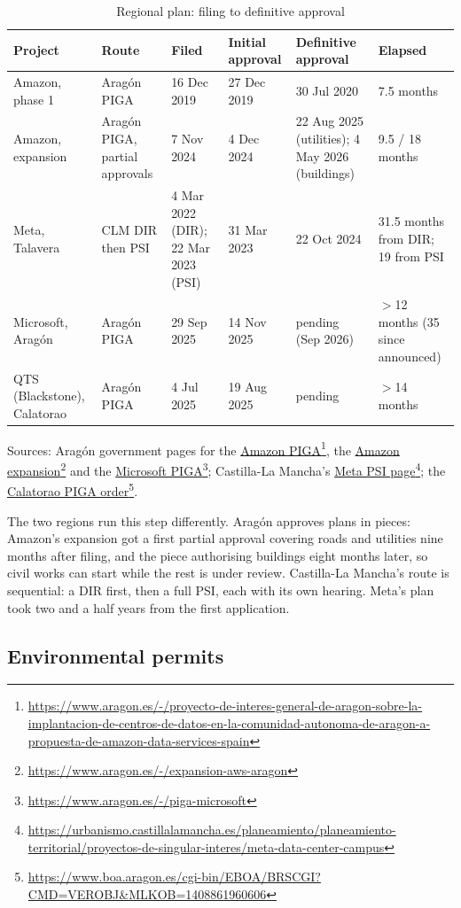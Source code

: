 \documentclass[11pt]{article}
\newcommand{\src}[2]{\href{#1}{#2}\footnote{\url{#1}}}
\begin{document}
\begin{table}[H]
\centering\small
\caption{Regional plan: filing to definitive approval}
\label{tab:plans}
\begin{tabular}{p{2.3cm}p{2.2cm}p{2.3cm}p{2.0cm}p{2.9cm}p{2.2cm}}
\toprule
Project & Route & Filed & Initial approval & Definitive approval & Elapsed \\
\midrule
Amazon, phase 1 & Aragón PIGA & 16 Dec 2019 & 27 Dec 2019 & 30 Jul 2020 & 7.5 months \\
Amazon, expansion & Aragón PIGA, partial approvals & 7 Nov 2024 & 4 Dec 2024 & 22 Aug 2025 (utilities); 4 May 2026 (buildings) & 9.5 / 18 months \\
Meta, Talavera & CLM DIR then PSI & 4 Mar 2022 (DIR); 22 Mar 2023 (PSI) & 31 Mar 2023 & 22 Oct 2024 & 31.5 months from DIR; 19 from PSI \\
Microsoft, Aragón & Aragón PIGA & 29 Sep 2025 & 14 Nov 2025 & pending (Sep 2026) & $>$12 months (35 since announced) \\
QTS (Blackstone), Calatorao & Aragón PIGA & 4 Jul 2025 & 19 Aug 2025 & pending & $>$14 months \\
\bottomrule
\end{tabular}
\end{table}

Sources: Aragón government pages for the \src{https://www.aragon.es/-/proyecto-de-interes-general-de-aragon-sobre-la-implantacion-de-centros-de-datos-en-la-comunidad-autonoma-de-aragon-a-propuesta-de-amazon-data-services-spain}{Amazon PIGA}, the \src{https://www.aragon.es/-/expansion-aws-aragon}{Amazon expansion} and the \src{https://www.aragon.es/-/piga-microsoft}{Microsoft PIGA}; Castilla-La Mancha's \src{https://urbanismo.castillalamancha.es/planeamiento/planeamiento-territorial/proyectos-de-singular-interes/meta-data-center-campus}{Meta PSI page}; the \src{https://www.boa.aragon.es/cgi-bin/EBOA/BRSCGI?CMD=VEROBJ&MLKOB=1408861960606}{Calatorao PIGA order}.

The two regions run this step differently. Aragón approves plans in pieces: Amazon's expansion got a first partial approval covering roads and utilities nine months after filing, and the piece authorising buildings eight months later, so civil works can start while the rest is under review. Castilla-La Mancha's route is sequential: a DIR first, then a full PSI, each with its own hearing. Meta's plan took two and a half years from the first application.

\subsection{Environmental permits}
\end{document}
